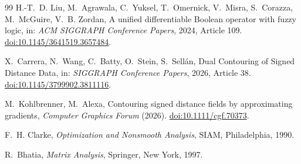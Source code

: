 \documentclass[11pt]{article}
\theoremstyle{definition}
\begin{document}
\begin{thebibliography}{99}
H.-T.~D. Liu, M.~Agrawala, C.~Yuksel, T.~Omernick, V.~Misra, S.~Corazza,
M.~McGuire, V.~B. Zordan,
A unified differentiable Boolean operator with fuzzy logic,
in: \emph{ACM SIGGRAPH Conference Papers}, 2024, Article 109.
\href{https://doi.org/10.1145/3641519.3657484}{doi:10.1145/3641519.3657484}.

X.~Carrera, N.~Wang, C.~Batty, O.~Stein, S.~Sell\'{a}n,
Dual Contouring of Signed Distance Data,
in: \emph{SIGGRAPH Conference Papers}, 2026, Article 38.
\href{https://doi.org/10.1145/3799902.3811116}{doi:10.1145/3799902.3811116}.

M.~Kohlbrenner, M.~Alexa,
Contouring signed distance fields by approximating gradients,
\emph{Computer Graphics Forum} (2026).
\href{https://doi.org/10.1111/cgf.70373}{doi:10.1111/cgf.70373}.

F.~H. Clarke,
\emph{Optimization and Nonsmooth Analysis},
SIAM, Philadelphia, 1990.

R.~Bhatia,
\emph{Matrix Analysis},
Springer, New York, 1997.

\end{thebibliography}
\end{document}
